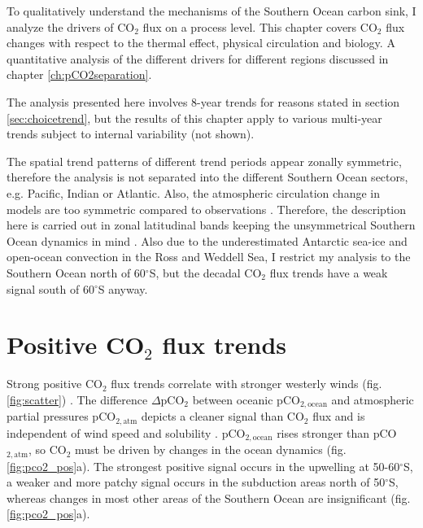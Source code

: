 To qualitatively understand the mechanisms of the Southern Ocean carbon sink, I analyze the drivers of CO$_2$ flux on a process level. This chapter covers CO$_2$ flux changes with respect to the thermal effect, physical circulation and biology. A quantitative analysis of the different drivers for different regions discussed in chapter \ref{ch:pCO2separation}.

The analysis presented here involves 8-year trends for reasons stated in section \ref{sec:choicetrend}, but the results of this chapter apply to various multi-year trends subject to internal variability (not shown).

The spatial trend patterns of different trend periods appear zonally symmetric, therefore the analysis is not separated into the different Southern Ocean sectors, e.g. Pacific, Indian or Atlantic. Also, the atmospheric circulation change in models are too symmetric compared to observations \citep{Haumann2014}. Therefore, the description here is carried out in zonal latitudinal bands keeping the unsymmetrical Southern Ocean dynamics in mind \citep{Sallee2010,Talley2013}. Also due to the underestimated Antarctic sea-ice and open-ocean convection in the Ross and Weddell Sea, I restrict my analysis to the Southern Ocean north of 60$^\circ$S, but the decadal CO$_2$ flux trends have a weak signal south of 60$^\circ$S anyway. 



\clearpage

\section{Positive CO$_2$ flux trends}
\label{sec:trends_pos}

Strong positive CO$_2$ flux trends correlate with stronger westerly winds (fig. \ref{fig:scatter}) \citep{Lovenduski2007}. The difference $\Delta$pCO$_2$ between oceanic pCO$_{2,\text{ocean}}$ and atmospheric partial pressures pCO$_{2,\text{atm}}$ depicts a cleaner signal than CO$_2$ flux and is independent of wind speed and solubility \citep{Lovenduski2015}. pCO$_{2,\text{ocean}}$ rises stronger than pCO$_{2,\text{atm}}$, so CO$_2$ must be driven by changes in the ocean dynamics (fig. \ref{fig:pco2_pos}a).
The strongest positive signal occurs in the upwelling at 50-60$^\circ$S, a weaker and more patchy signal occurs in the subduction areas north of 50$^\circ$S, whereas changes in most other areas of the Southern Ocean are insignificant (fig. \ref{fig:pco2_pos}a). 

